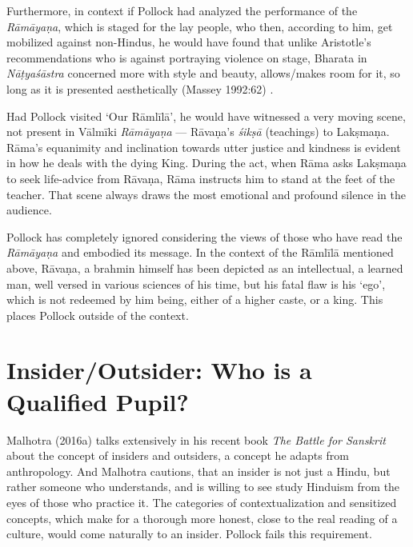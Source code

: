 Furthermore, in context if Pollock had analyzed the performance of the \textit{Rāmāyaṇa}, which is staged for the lay people, who then, according to him, get mobilized against non-Hindus, he would have found that unlike Aristotle’s recommendations who is against portraying violence on stage, Bharata in \textit{Nāṭyaśāstra} concerned more with style and beauty, allows/makes room for it, so long as it is presented aesthetically (Massey 1992:62) .

Had Pollock visited ‘Our Rāmlīlā’, he would have witnessed a very moving scene, not present in Vālmīki \textit{Rāmāyaṇa} — Rāvaṇa’s \textit{śikṣā} (teachings) to Lakṣmaṇa. Rāma’s equanimity and inclination towards utter justice and kindness is evident in how he deals with the dying King. During the act, when Rāma asks Lakṣmaṇa to seek life-advice from Rāvaṇa, Rāma instructs him to stand at the feet of the teacher. That scene always draws the most emotional and profound silence in the audience.

Pollock has completely ignored considering the views of those who have read the \textit{Rāmāyaṇa} and embodied its message. In the context of the Rāmlīlā mentioned above, Rāvaṇa, a brahmin himself has been depicted as an intellectual, a learned man, well versed in various sciences of his time, but his fatal flaw is his ‘ego’, which is not redeemed by him being, either of a higher caste, or a king. This places Pollock outside of the context.


\section*{Insider/Outsider: Who is a Qualified Pupil?}

Malhotra (2016a) talks extensively in his recent book \textit{The Battle for Sanskrit} about the concept of insiders and outsiders, a concept he adapts from anthropology. And Malhotra cautions, that an insider is not just a Hindu, but rather someone who understands, and is willing to see study Hinduism from the eyes of those who practice it. The categories of contextualization and sensitized concepts, which make for a thorough more honest, close to the real reading of a culture, would come naturally to an insider. Pollock fails this requirement.

